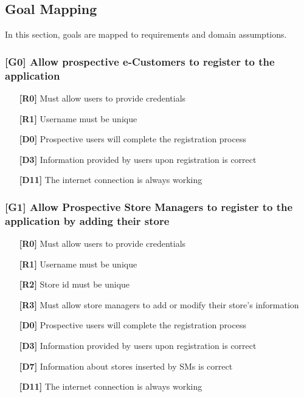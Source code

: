 
\subsection{Goal Mapping}
In this section, goals are mapped to requirements and domain assumptions.

\subsubsection{[G0] Allow prospective e-Customers to register to the application}
\begin{itemize}
	\setlength\itemsep{-1mm}
	\item [\textbf{[R0]}] Must allow users to provide credentials
	\item [\textbf{[R1]}] Username must be unique 
	\\
	\item [\textbf{[D0]}] Prospective users will complete the registration process
	\item [\textbf{[D3]}] Information provided by users upon registration is correct
	\item [\textbf{[D11]}] The internet connection is always working
\end{itemize}

\subsubsection{[G1] Allow Prospective Store Managers to register to the application by adding their store}
\begin{itemize}
	\setlength\itemsep{-1mm}
	\item [\textbf{[R0]}] Must allow users to provide credentials
	\item [\textbf{[R1]}] Username must be unique 
	\item [\textbf{[R2]}] Store id must be unique
	\item [\textbf{[R3]}] Must allow store managers to add or modify their store’s information
	\\
	\item [\textbf{[D0]}] Prospective users will complete the registration process
	\item [\textbf{[D3]}] Information provided by users upon registration is correct
	\item [\textbf{[D7]}] Information about stores inserted by SMs is correct
	\item [\textbf{[D11]}] The internet connection is always working
\end{itemize}

